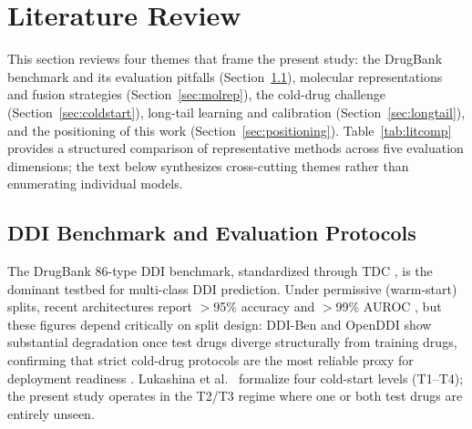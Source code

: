 \documentclass[11pt,a4paper,twocolumn]{article}
\begin{document}
\section{Literature Review}

This section reviews four themes that frame the present study: the DrugBank
benchmark and its evaluation pitfalls (Section~\ref{sec:benchmark}), molecular
representations and fusion strategies (Section~\ref{sec:molrep}), the cold-drug
challenge (Section~\ref{sec:coldstart}), long-tail learning and calibration
(Section~\ref{sec:longtail}), and the positioning of this work
(Section~\ref{sec:positioning}).
Table~\ref{tab:litcomp} provides a structured comparison of representative
methods across five evaluation dimensions; the text below synthesizes cross-cutting
themes rather than enumerating individual models.

\subsection{DDI Benchmark and Evaluation Protocols}
\label{sec:benchmark}
The DrugBank 86-type DDI benchmark, standardized through TDC
\cite{wishart2018drugbank, huang2021tdc}, is the dominant testbed for multi-class
DDI prediction.
Under permissive (warm-start) splits, recent architectures report $>$95\% accuracy
and $>$99\% AUROC \cite{lin2024masmddi, feng2024bdnddi}, but these figures depend
critically on split design: DDI-Ben \cite{shen2025ddiben} and OpenDDI
\cite{openddi2025} show substantial degradation once test drugs diverge
structurally from training drugs, confirming that strict cold-drug protocols are
the most reliable proxy for deployment readiness
\cite{lin2023evaluation, lukashina2021coldstart}.
Lukashina et al.\ \cite{lukashina2021coldstart} formalize four cold-start levels
(T1--T4); the present study operates in the T2/T3 regime where one or both test
drugs are entirely unseen.

\end{document}
